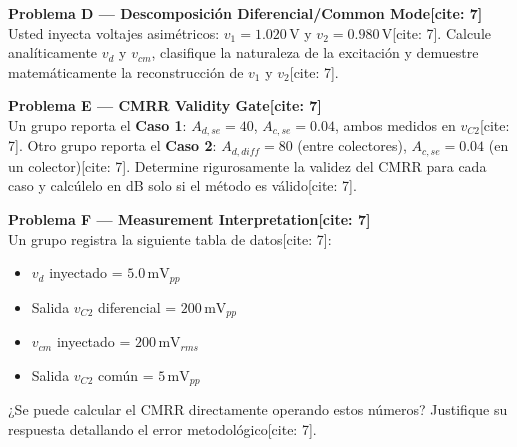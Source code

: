 \documentclass[11pt, a4paper]{article}
\begin{document}
\noindent \textbf{Problema D — Descomposición Diferencial/Common Mode[cite: 7]} \\
Usted inyecta voltajes asimétricos: $v_1=1.020\,\text{V}$ y $v_2=0.980\,\text{V}$[cite: 7]. 
Calcule analíticamente $v_d$ y $v_{cm}$, clasifique la naturaleza de la excitación y demuestre matemáticamente la reconstrucción de $v_1$ y $v_2$[cite: 7].
\vspace{3cm}

\noindent \textbf{Problema E — CMRR Validity Gate[cite: 7]} \\
Un grupo reporta el \textbf{Caso 1}: $A_{d,se}=40$, $A_{c,se}=0.04$, ambos medidos en $v_{C2}$[cite: 7]. 
Otro grupo reporta el \textbf{Caso 2}: $A_{d,diff}=80$ (entre colectores), $A_{c,se}=0.04$ (en un colector)[cite: 7]. 
Determine rigurosamente la validez del CMRR para cada caso y calcúlelo en dB solo si el método es válido[cite: 7].
\vspace{3cm}

\noindent \textbf{Problema F — Measurement Interpretation[cite: 7]} \\
Un grupo registra la siguiente tabla de datos[cite: 7]:
\begin{itemize}
    \item $v_d$ inyectado = $5.0\,\text{mV}_{pp}$
    \item Salida $v_{C2}$ diferencial = $200\,\text{mV}_{pp}$
    \item $v_{cm}$ inyectado = $200\,\text{mV}_{rms}$
    \item Salida $v_{C2}$ común = $5\,\text{mV}_{pp}$
\end{itemize}
¿Se puede calcular el CMRR directamente operando estos números? Justifique su respuesta detallando el error metodológico[cite: 7].
\vspace{2.5cm}
\end{document}
